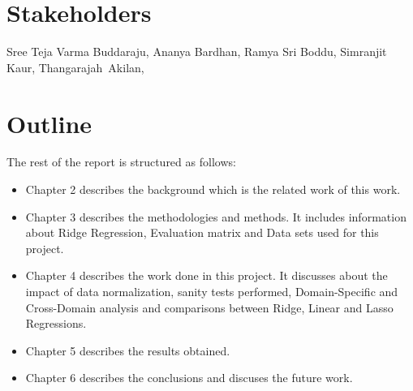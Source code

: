 \section{Stakeholders}
Sree Teja Varma Buddaraju, Ananya Bardhan, Ramya Sri Boddu, Simranjit Kaur, Thangarajah~Akilan,~


\section{Outline}
The rest of the report is structured as follows:  
\begin{itemize}
    \item Chapter 2 describes the background which is the related work of this work.
    \item Chapter 3 describes the methodologies and methods. It includes information about Ridge Regression, Evaluation matrix and Data sets used for this project.
    \item Chapter 4 describes the work done in this project. It discusses about the impact of data normalization, sanity tests performed, Domain-Specific and Cross-Domain analysis and comparisons between Ridge, Linear and Lasso Regressions.
    \item Chapter 5 describes the results obtained.
    \item Chapter 6 describes the conclusions and discuses the future work.
\end{itemize}
  
